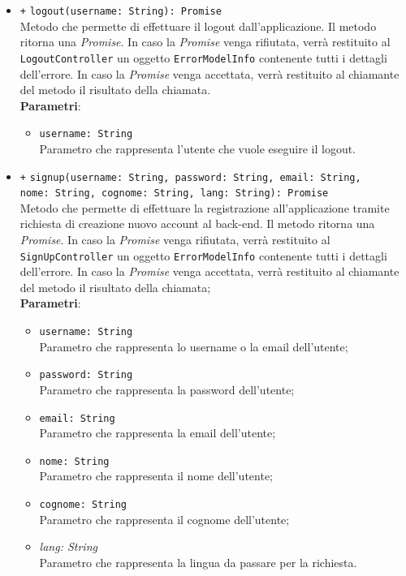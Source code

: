 \begin{itemize}
\begin{itemize}
		\item \texttt{+} \texttt{logout(username: String): Promise} \\ Metodo che permette di effettuare il logout dall'applicazione. Il metodo ritorna una \textit{Promise}. In caso la \textit{Promise} venga rifiutata, verrà restituito al \texttt{LogoutController} un oggetto \texttt{ErrorModelInfo} contenente tutti i dettagli dell'errore. In caso la \textit{Promise} venga accettata, verrà restituito al chiamante del metodo il risultato della chiamata.\\
		\textbf{Parametri}:
		\begin{itemize}
			\item \texttt{username: String} \\ Parametro che rappresenta l'utente che vuole eseguire il logout.
		\end{itemize}
		
		\item \texttt{+} \texttt{signup(username: String, password: String, email: String, \\ nome: String, cognome: String, lang: String): Promise} \\Metodo che permette di effettuare la registrazione all'applicazione tramite richiesta di creazione nuovo account al back-end. Il metodo ritorna una \textit{Promise}. In caso la \textit{Promise} venga rifiutata, verrà restituito al \texttt{SignUpController} un oggetto \texttt{ErrorModelInfo} contenente tutti i dettagli dell'errore. In caso la \textit{Promise} venga accettata, verrà restituito al chiamante del metodo il risultato della chiamata; \\
			\textbf{Parametri}:
			\begin{itemize}
				\item \texttt{username: String} \\ Parametro che rappresenta lo username o la email dell'utente;
				\item \texttt{password: String} \\ Parametro che rappresenta la password dell'utente;
				\item \texttt{email: String} \\ Parametro che rappresenta la email dell'utente;
				\item \texttt{nome: String} \\ Parametro che rappresenta il nome dell'utente;
				\item \texttt{cognome: String} \\ Parametro che rappresenta il cognome dell'utente;
				\item \textit{lang: String} \\ Parametro che rappresenta la lingua da passare per la richiesta.
			\end{itemize}
			

\end{itemize}
\end{itemize}
